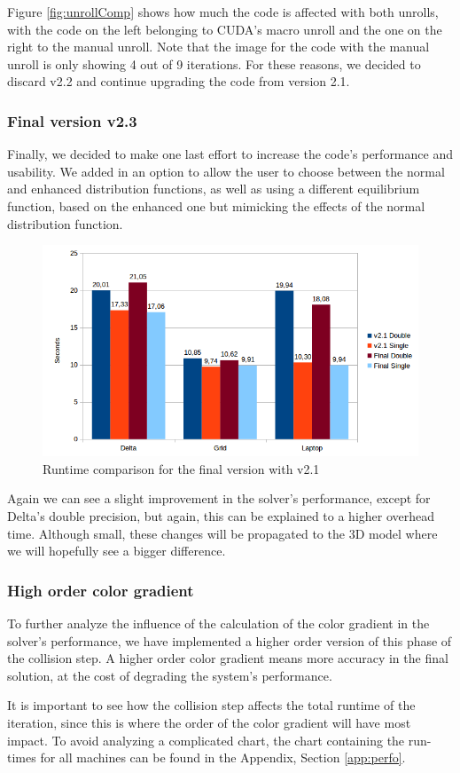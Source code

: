 \documentclass[12pt]{book}
\begin{document}
Figure \ref{fig:unrollComp} shows how much the code is affected with both unrolls, with the code on the left belonging to CUDA's macro unroll and the one on the right to the manual unroll. Note that the image for the code with the manual unroll is only showing 4 out of 9 iterations. For these reasons, we decided to discard v2.2 and continue upgrading the code from version 2.1.
\subsubsection{Final version v2.3}
Finally, we decided to make one last effort to increase the code's performance and usability. We added in an option to allow the user to choose between the normal and enhanced distribution functions, as well as using a different equilibrium function, based on the enhanced one but mimicking the effects of the normal distribution function. 

  \begin{figure}[H]
  	\centering
  	\includegraphics[width=\linewidth]{Resources/Images/vfv.png}
  	\caption{Runtime comparison for the final version with v2.1}
  	\label{fig:vfv}
  \end{figure}
  
  Again we can see a slight improvement in the solver's performance, except for Delta's double precision, but again, this can be explained to a higher overhead time. Although small, these changes will be propagated to the 3D model where we will hopefully see a bigger difference.
\subsubsection{High order color gradient}
To further analyze the influence of the calculation of the color gradient in the solver's performance, we have implemented a higher order version of this phase of the collision step. A higher order color gradient means more accuracy in the final solution, at the cost of degrading the system's performance.\par
It is important to see how the collision step affects the total runtime of the iteration, since this is where the order of the color gradient will have most impact. To avoid analyzing a complicated chart, the chart containing the run-times for all machines can be found in the Appendix, Section \ref{app:perfo}.
\end{document}

